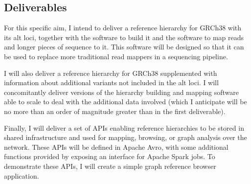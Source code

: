 \documentclass[11pt,proposal]{ucthesis}
\begin{document}
\subsection{Deliverables} 

For this specific aim, I intend to deliver a reference hierarchy for GRCh38 with its alt loci, together with the software to build it and the software to map reads and longer pieces of sequence to it. This software will be designed so that it can be used to replace more traditional read mappers in a sequencing pipeline.

I will also deliver a reference hierarchy for GRCh38 supplemented with information about additional variants not included in the alt loci. I will concomitantly deliver versions of the hierarchy building and mapping software able to scale to deal with the additional data involved (which I anticipate will be no more than an order of magnitude greater than in the first deliverable).

Finally, I will deliver a set of APIs enabling reference hierarchies to be stored in shared infrastructure and used for mapping, browsing, or graph analysis over the network. These APIs will be defined in Apache Avro, with some additional functions provided by exposing an interface for Apache Spark jobs. To demonstrate these APIs, I will create a simple graph reference browser application.


    
    
    
    
    

    
\end{document}
